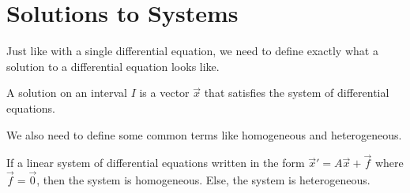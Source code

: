 \section{Solutions to Systems}
\noindent
Just like with a single differential equation, we need to define exactly what a solution to a differential equation looks like.
\begin{definition}
	A solution on an interval $I$ is a vector $\vec{x}$ that satisfies the system of differential equations.
\end{definition}

\noindent
We also need to define some common terms like homogeneous and heterogeneous.
\begin{definition}
	If a linear system of differential equations written in the form $\vec{x}' = A\vec{x} + \vec{f}$ where $\vec{f} = \vec{0}$, then the system is homogeneous. Else, the system is heterogeneous.
\end{definition}

